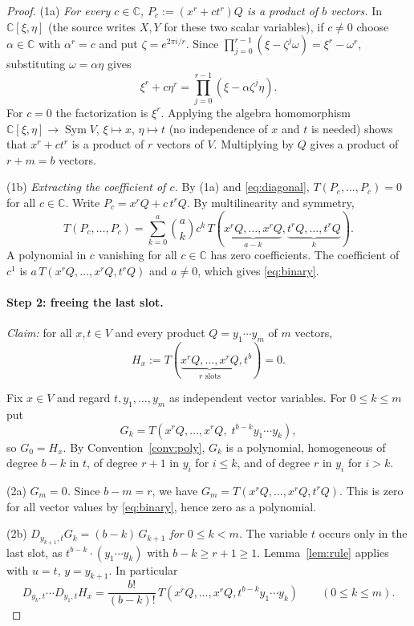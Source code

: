 \documentclass[11pt]{article}
\theoremstyle{definition}
\theoremstyle{remark}
\DeclareMathOperator{\Sym}{Sym}
\newcommand{\C}{\mathbb C}
\newcommand{\D}[2]{D_{#1,#2}}
\begin{document}
\begin{proof}
(1a) \emph{For every $c\in\C$, $P_c:=(x^r+ct^r)Q$ is a product of $b$
vectors.} In $\C[\xi,\eta]$ (the source writes $X,Y$ for these two scalar
variables), if $c\ne0$ choose $\alpha\in\C$ with $\alpha^r=c$ and put
$\zeta=e^{2\pi i/r}$. Since
$\prod_{j=0}^{r-1}(\xi-\zeta^j\omega)=\xi^r-\omega^r$, substituting
$\omega=\alpha\eta$ gives
\[
 \xi^r+c\eta^r=\prod_{j=0}^{r-1}(\xi-\alpha\zeta^j\eta).
\]
For $c=0$ the factorization is $\xi^r$. Applying the algebra homomorphism
$\C[\xi,\eta]\to\Sym V$, $\xi\mapsto x$, $\eta\mapsto t$ (no independence of
$x$ and $t$ is needed) shows that $x^r+ct^r$ is a product of $r$ vectors of
$V$. Multiplying by $Q$ gives a product of $r+m=b$ vectors.

(1b) \emph{Extracting the coefficient of $c$.} By (1a) and
\eqref{eq:diagonal}, $T(P_c,\ldots,P_c)=0$ for all $c\in\C$. Write
$P_c=x^rQ+c\,t^rQ$. By multilinearity and symmetry,
\[
 T(P_c,\ldots,P_c)=\sum_{k=0}^a\binom akc^k\,
 T(\underbrace{x^rQ,\ldots,x^rQ}_{a-k},\underbrace{t^rQ,\ldots,t^rQ}_{k}).
\]
A polynomial in $c$ vanishing for all $c\in\C$ has zero coefficients. The
coefficient of $c^1$ is $a\,T(x^rQ,\ldots,x^rQ,t^rQ)$ and $a\ne0$, which
gives \eqref{eq:binary}.

\paragraph{Step 2: freeing the last slot.}
\emph{Claim:} for all $x,t\in V$ and every product $Q=y_1\cdots y_m$ of $m$
vectors,
\begin{equation}\label{eq:step2}
 H_x:=T(\underbrace{x^rQ,\ldots,x^rQ}_{r\text{ slots}},t^b)=0.
\end{equation}

Fix $x\in V$ and regard $t,y_1,\ldots,y_m$ as independent vector variables.
For $0\le k\le m$ put
\[
 G_k=T(x^rQ,\ldots,x^rQ,\;t^{b-k}y_1\cdots y_k),
\]
so $G_0=H_x$. By Convention~\ref{conv:poly}, $G_k$ is a polynomial,
homogeneous of degree $b-k$ in $t$, of degree $r+1$ in $y_i$ for $i\le k$,
and of degree $r$ in $y_i$ for $i>k$.

(2a) \emph{$G_m=0$.} Since $b-m=r$, we have
$G_m=T(x^rQ,\ldots,x^rQ,t^rQ)$. This is zero for all vector values by
\eqref{eq:binary}, hence zero as a polynomial.

(2b) \emph{$\D{y_{k+1}}{t}G_k=(b-k)\,G_{k+1}$ for $0\le k<m$.} The variable
$t$ occurs only in the last slot, as $t^{b-k}\cdot(y_1\cdots y_k)$ with
$b-k\ge r+1\ge1$. Lemma~\ref{lem:rule} applies with $u=t$, $y=y_{k+1}$. In
particular
\begin{equation}\label{eq:first-composition}
 \D{y_k}{t}\cdots\D{y_1}{t}H_x
 =\frac{b!}{(b-k)!}\,
 T(x^rQ,\ldots,x^rQ,t^{b-k}y_1\cdots y_k)\qquad(0\le k\le m).
\end{equation}


\end{proof}
\end{document}
